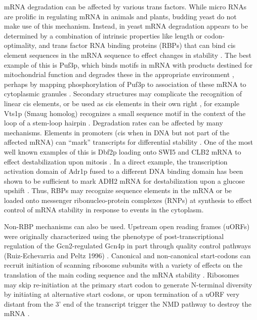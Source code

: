 {mRNA
degradation can be affected by various trans factors. While micro RNAs
are prolific in regulating mRNA in animals and plants, budding yeast
do not make use of this mechanism. Instead, in yeast mRNA degradation
appears to be determined by a combination of intrinsic properties like
length or codon-optimality, and trans factor RNA binding proteins
(RBPs) that can bind cis element sequences in the mRNA sequence to
effect changes in stability 
\parencite{li2010predicting,cheng2017cis}. The best
example of this is Puf3p, which binds motifs in mRNA with products
destined for mitochondrial function and degrades these in the
appropriate environment 
\parencite{olivas2000puf3,miller2013carbon}, perhaps by
mapping phosphorylation of Puf3p to association of these mRNA to
cytoplasmic granules 
\parencite{lee2015glucose}. Secondary structures may
complicate the recognition of linear cis elements, or be used as cis
elements in their own right \parencite{li2010predicting},
for example Vts1p (Smaug homolog) recognizes a small sequence 
motif in the context of the loop of a stem-loop hairpin 
\parencite{she2017comprehensive,aviv2003rna}.
Degradation rates can be affected by many mechanisms. Elements in
promoters (cis when in DNA but not part of the affected mRNA) can
“mark” transcripts for differential stability 
\parencite{haimovich2013gene}.
One of the most well known examples of this is Dbf2p loading onto SWI5
and CLB2 mRNA to effect destabilization upon mitosis 
\parencite{trcek2011single}. 
In a direct example, the transcription activation domain of
Adr1p fused to a different DNA binding domain has been shown to be
sufficient to mark ADH2 mRNA for destabilization upon a glucose
upshift \parencite{braun2016snf1}.
Thus, RBPs may recognize sequence
elements in the mRNA or be loaded onto messenger ribonucleo-protein
complexes (RNPs) at synthesis 
\parencite{gupta2016translational}
to effect control of
mRNA stability in response to events in the cytoplasm.  

Non-RBP
mechanisms can also be used. Upstream open reading frames (uORFs) were
originally characterized using the phenotype of post-transcriptional
regulation of the Gcn2-regulated Gcn4p 
\parencite{dever1992phosphorylation}
in part
through quality control pathways 
(Ruiz-Echevarria and Peltz 1996)
\parencite{ruiz1996utilizing}.
Canonical and non-canonical start-codons can recruit initiation of
scanning ribosome subunits with a variety of effects on the
translation of the main coding sequence and the mRNA stability
\parencite{spealman2017conserved}. Ribosomes may skip re-initiation at the
primary start codon to generate N-terminal diversity by initiating at
alternative start codons, or upon termination of a uORF very distant
from the 3’ end of the transcript trigger the NMD pathway to destroy
the mRNA \parencite{dever2016mechanism}. 

}
